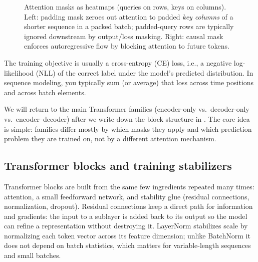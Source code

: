 \begin{figure}[t]
    \caption{Attention masks as heatmaps (queries on rows, keys on columns). Left: padding mask zeroes out attention to padded \emph{key columns} of a shorter sequence in a packed batch; padded-query rows are typically ignored downstream by output/loss masking. Right: causal mask enforces autoregressive flow by blocking attention to future tokens.}
    \label{fig:lec13_masks}
\end{figure}
\FloatBarrier

The training objective is usually a cross-entropy (CE) loss, i.e., a negative log-likelihood (NLL) of the correct label under the model's predicted distribution. In sequence modeling, you typically sum (or average) that loss across time positions and across batch elements.

We will return to the main Transformer families (encoder-only vs.\ decoder-only vs.\ encoder--decoder) after we write down the block structure in . The core idea is simple: families differ mostly by which masks they apply and which prediction problem they are trained on, not by a different attention mechanism.

\subsection{Transformer blocks and training stabilizers}
\label{sec:transformers_encoder_decoder_stacks_and_stabilizers}
Transformer blocks are built from the same few ingredients repeated many times: attention, a small feedforward network, and
stability glue (residual connections, normalization, dropout). Residual connections keep a direct path for information and
gradients: the input to a sublayer is added back to its output so the model can refine a representation without destroying it.
LayerNorm stabilizes scale by normalizing each token vector across its feature dimension; unlike BatchNorm it does not depend
on batch statistics, which matters for variable-length sequences and small batches.


